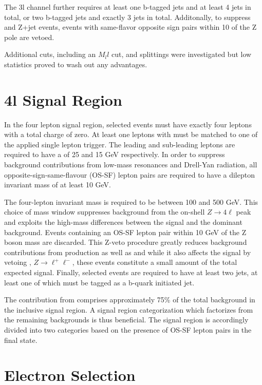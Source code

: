 The 3l channel further requires at least one b-tagged jets and at least 4 jets in total, or two b-tagged jets and exactly 3 jets in 
total. Additonally, to suppress \WZ and Z+jet events, events with same-flavor opposite sign pairs
within 10 \gevcc of the Z pole are vetoed.

Additional cuts, including an $M_ll$ cut, and splittings were investigated but low statistics proved to wash out any advantages. 

\section{4l Signal Region}

In the four lepton signal region, selected events must have exactly four leptons with a total charge of zero. 
At least one leptons with must be matched to one of the applied single lepton trigger. 
The leading and sub-leading leptons are required to have a \pt of 25 and 15 GeV respectively. 
In order to suppress background contributions from low-mass resonances and Drell-Yan radiation, all opposite-sign-same-flavour (OS-SF) lepton pairs are required to have a dilepton invariant mass of at least 10 GeV. 

The four-lepton invariant mass is required to be between 100 and 500 GeV. 
This choice of mass window suppresses background from the on-shell $Z\to4\ell$ peak and exploits the high-mass differences between the signal and the dominant \ttZ background. 
Events containing an OS-SF lepton pair within 10 GeV of the Z boson mass are discarded. 
This Z-veto procedure greatly reduces background contributions from \ZZ production as well as \ttZ and while it also affects the signal by vetoing \hzzstar, $Z\to\ell^+\ell^-$, these events constitute a small amount of the total expected signal. 
Finally, selected events are required to have at least two jets, at least one of which must be tagged as a b-quark initiated jet.  

The contribution from \ttZ comprises approximately 75\% of the total background in the inclusive signal region. 
A signal region categorization which factorizes \ttZ from the remaining backgrounds is thus beneficial. 
The signal region is accordingly divided into two categories based on the presence of OS-SF lepton pairs in the final state. 

\section{Electron Selection}

